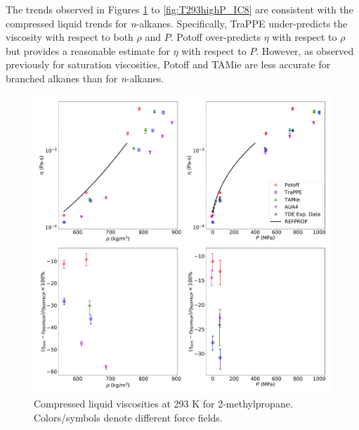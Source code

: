 \documentclass[preprint,review,12pt]{elsarticle}
\begin{document}
   The trends observed in Figures \ref{fig:T293highP_IC4} to \ref{fig:T293highP_IC8} are consistent with the compressed liquid trends for \textit{n}-alkanes. Specifically, TraPPE under-predicts the viscosity with respect to both $\rho$ and $P$. Potoff over-predicts $\eta$ with respect to $\rho$ but provides a reasonable estimate for $\eta$ with respect to $P$. However, as observed previously for saturation viscosities, Potoff and TAMie are less accurate for branched alkanes than for \textit{n}-alkanes.  
	
	\begin{figure}[htb!]
		\centering
		\includegraphics[width=6.4in]{compare_REFPROP_T293highP_IC4H10.pdf}
		\caption{Compressed liquid viscosities at 293 K for 2-methylpropane. Colors/symbols denote different force fields.}
		\label{fig:T293highP_IC4}
	\end{figure} 
	
\end{document}
